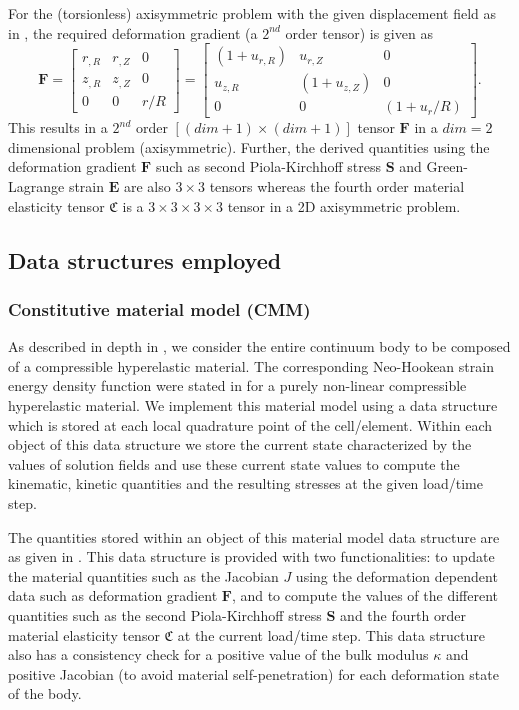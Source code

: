 For the (torsionless) axisymmetric problem with the given displacement field as in , the required deformation gradient (a $2^{nd}$ order tensor) is given as \cite{Zienkiewicz2013}
\begin{equation}
\mathbf{F} = \begin{bmatrix}
r_{, R} & r_{, Z} & 0 \\
z_{, R} & z_{, Z} & 0 \\
0 & 0 & r/R
\end{bmatrix} = \begin{bmatrix}
(1 + u_{r, R}) & u_{r, Z} & 0 \\
u_{z, R} & (1 + u_{z, Z}) & 0 \\
0 & 0 & (1 + u_r / R)
\end{bmatrix}.
\label{eq:2.26}
\end{equation}
This results in a $2^{nd}$ order $[(dim + 1) \times (dim + 1)]$ tensor $\mathbf{F}$ in a $dim = 2$ dimensional problem (axisymmetric).  Further, the derived quantities using the deformation gradient $\mathbf{F}$ such as second Piola-Kirchhoff stress $\mathbf{S}$ and Green-Lagrange strain $\mathbf{E}$ are also $3 \times 3$ tensors whereas the fourth order material elasticity tensor $\mathfrak{C}$ is a $3 \times 3 \times 3 \times 3$ tensor in a 2D axisymmetric problem.

\subsection{Data structures employed}
\subsubsection{Constitutive material model (CMM)}
As described in depth in , we consider the entire continuum body to be composed of a compressible hyperelastic material. The corresponding Neo-Hookean strain energy density function were stated in  for a purely non-linear compressible hyperelastic material. We implement this material model using a data structure which is stored at each local quadrature point of the cell/element. Within each object of this data structure we store the current state characterized by the values of solution fields and use these current state values to compute the kinematic, kinetic quantities and the resulting stresses at the given load/time step.\par 
The quantities stored within an object of this material model data structure are as given in . This data structure is provided with two functionalities: to update the material quantities such as the Jacobian $J$ using the deformation dependent data such as deformation gradient $\mathbf{F}$, and to compute the values of the different quantities such as the second Piola-Kirchhoff stress $\mathbf{S}$ and the fourth order material elasticity tensor $\mathfrak{C}$ at the current load/time step. This data structure also has a consistency check for a positive value of the bulk modulus $\kappa$ and positive Jacobian (to avoid material self-penetration) for each deformation state of the body. \par 

